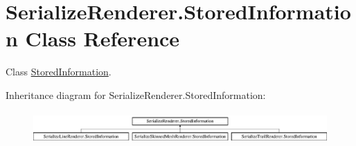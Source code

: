 \hypertarget{class_serialize_renderer_1_1_stored_information}{}\section{Serialize\+Renderer.\+Stored\+Information Class Reference}
\label{class_serialize_renderer_1_1_stored_information}


Class \hyperlink{class_serialize_renderer_1_1_stored_information}{Stored\+Information}.  


Inheritance diagram for Serialize\+Renderer.\+Stored\+Information\+:\begin{figure}[H]
\begin{center}
\leavevmode
\includegraphics[height=1.240310cm]{class_serialize_renderer_1_1_stored_information}
\end{center}
\end{figure}
